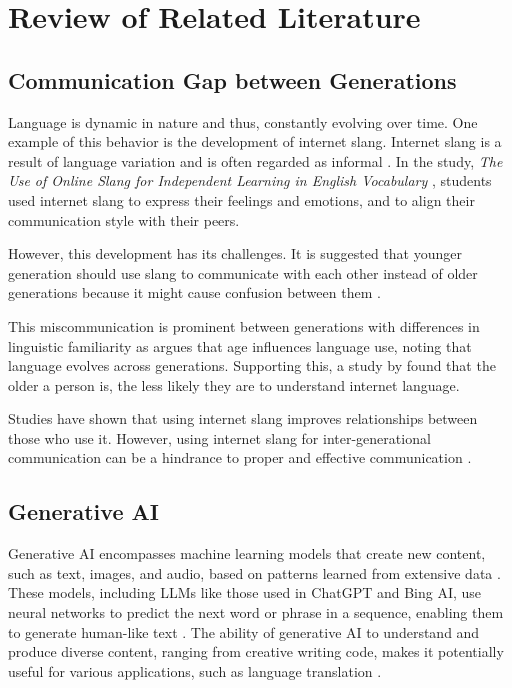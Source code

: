 \chapter{Review of Related Literature}
\label{sec:relatedlit}

\section{Communication Gap between Generations}
Language is dynamic in nature and thus, constantly evolving over time. One example of this behavior is the development of internet slang. Internet slang is a result of language variation and is often regarded as informal \cite{Liu_Gui_Zuo_Dai_2019}. In the study, \textit{The Use of Online Slang for Independent Learning in English Vocabulary} \cite{Ambarsari_Amrullah_Nawawi_2020}, students used internet slang to express their feelings and emotions, and to align their communication style with their peers. 

However, this development has its challenges. It is suggested that younger generation should use slang to communicate with each other instead of older generations because it might cause confusion between them \cite{Jeresano_Carretero_2022}.

This miscommunication is prominent between generations with differences in linguistic familiarity as  argues that age influences language use, noting that language evolves across generations.
Supporting this, a study by  found that the older a person is, the less likely they are to understand internet language.

Studies have shown that using internet slang improves relationships between those who use it. However, using internet slang for inter-generational communication can be a hindrance to proper and effective communication \cite{gonzagaforda}.

\section{Generative AI}
Generative AI encompasses machine learning models that create new content, such as text, images, and audio, based on patterns learned from extensive data \cite{euchner2023generative}. These models, including LLMs like those used in ChatGPT and Bing AI, use neural networks to predict the next word or phrase in a sequence, enabling them to generate human-like text \cite{brynjolfsson2023generative}. The ability of generative AI to understand and produce diverse content, ranging from creative writing code, makes it potentially useful for various applications, such as language translation \cite{fui2023generative}. 

